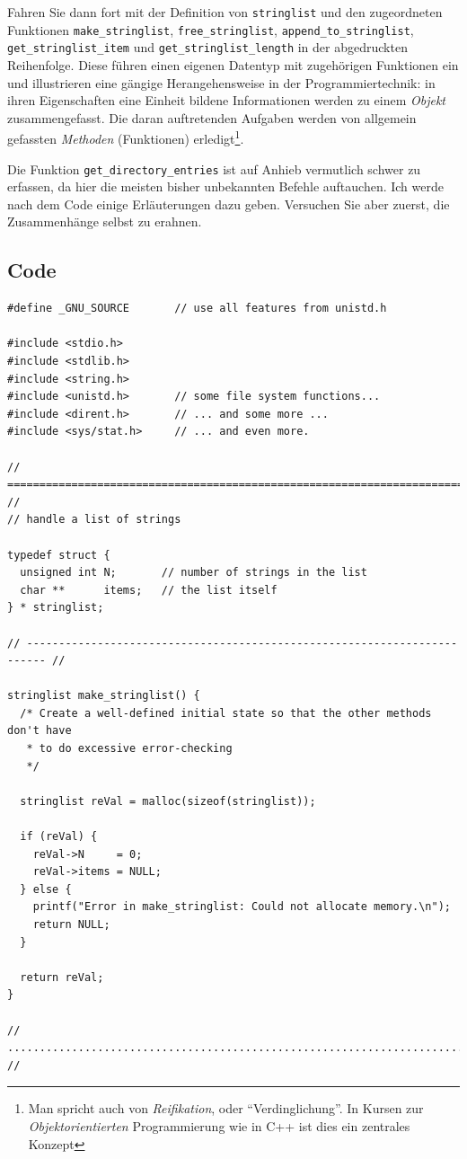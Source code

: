 Fahren Sie dann fort mit der Definition von \texttt{stringlist} und den zugeordneten Funktionen \texttt{make\_stringlist}, \texttt{free\_stringlist}, \texttt{append\_to\_stringlist}, 
\texttt{get\_stringlist\_item} und \texttt{get\_stringlist\_length} in der abgedruckten Reihenfolge. Diese führen einen eigenen Datentyp mit zugehörigen Funktionen ein und illustrieren eine gängige Herangehensweise in der Programmiertechnik: in ihren Eigenschaften eine Einheit bildene Informationen werden zu einem \emph{Objekt} zusammengefasst. Die daran auftretenden Aufgaben werden von allgemein gefassten \emph{Methoden} (Funktionen) erledigt\footnote{Man spricht auch von \emph{Reifikation}, oder \enquote{Verdinglichung}. In Kursen zur \emph{Objektorientierten} Programmierung wie in C++ ist dies ein zentrales Konzept}.

Die Funktion \texttt{get\_directory\_entries} ist auf Anhieb vermutlich schwer zu erfassen, da hier die meisten bisher unbekannten Befehle auftauchen. Ich werde nach dem Code einige Erläuterungen dazu geben. Versuchen Sie aber zuerst, die Zusammenhänge selbst zu erahnen.

\subsection{Code}
\begin{codebox}
\begin{verbatim}
#define _GNU_SOURCE       // use all features from unistd.h

#include <stdio.h>
#include <stdlib.h>
#include <string.h>
#include <unistd.h>       // some file system functions...
#include <dirent.h>       // ... and some more ...
#include <sys/stat.h>     // ... and even more.

// ========================================================================= //
// handle a list of strings

typedef struct {
  unsigned int N;       // number of strings in the list
  char **      items;   // the list itself
} * stringlist;

// ------------------------------------------------------------------------- //

stringlist make_stringlist() {
  /* Create a well-defined initial state so that the other methods don't have
   * to do excessive error-checking
   */
  
  stringlist reVal = malloc(sizeof(stringlist));
  
  if (reVal) {
    reVal->N     = 0;
    reVal->items = NULL;
  } else {
    printf("Error in make_stringlist: Could not allocate memory.\n");
    return NULL;
  }
  
  return reVal;
}

// ......................................................................... //
\end{verbatim}
\end{codebox}

